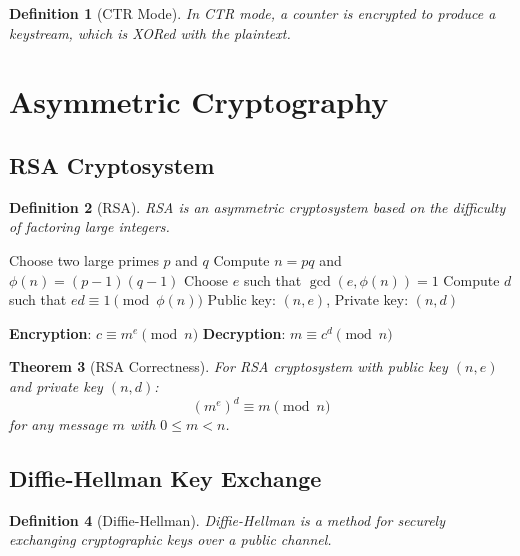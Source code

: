 \documentclass[11pt,a4paper]{article}
\newtheorem{theorem}{Theorem}[section]
\newtheorem{definition}[theorem]{Definition}
\begin{document}
\begin{definition}[CTR Mode]
In CTR mode, a counter is encrypted to produce a keystream, which is XORed with the plaintext.
\end{definition}

\section{Asymmetric Cryptography}

\subsection{RSA Cryptosystem}

\begin{definition}[RSA]
RSA is an asymmetric cryptosystem based on the difficulty of factoring large integers.
\end{definition}

\begin{algorithm}
\caption{RSA Key Generation}
\begin{algorithmic}[1]
\STATE Choose two large primes $p$ and $q$
\STATE Compute $n = pq$ and $\phi(n) = (p-1)(q-1)$
\STATE Choose $e$ such that $\gcd(e, \phi(n)) = 1$
\STATE Compute $d$ such that $ed \equiv 1 \pmod{\phi(n)}$
\STATE Public key: $(n, e)$, Private key: $(n, d)$
\end{algorithmic}
\end{algorithm}

\begin{algorithm}
\caption{RSA Encryption/Decryption}
\begin{algorithmic}[1]
\STATE \textbf{Encryption}: $c \equiv m^e \pmod{n}$
\STATE \textbf{Decryption}: $m \equiv c^d \pmod{n}$
\end{algorithmic}
\end{algorithm}

\begin{theorem}[RSA Correctness]
For RSA cryptosystem with public key $(n,e)$ and private key $(n,d)$:
$$(m^e)^d \equiv m \pmod{n}$$
for any message $m$ with $0 \leq m < n$.
\end{theorem}

\subsection{Diffie-Hellman Key Exchange}

\begin{definition}[Diffie-Hellman]
Diffie-Hellman is a method for securely exchanging cryptographic keys over a public channel.
\end{definition}
\end{document}
